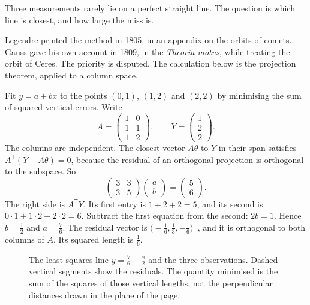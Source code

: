 Three measurements rarely lie on a perfect straight line. The question is which line is closest, and how large the miss is.

Legendre printed the method in 1805, in an appendix on the orbits of comets. Gauss gave his own account in 1809, in the \emph{Theoria motus}, while treating the orbit of Ceres. The priority is disputed. The calculation below is the projection theorem, applied to a column space.

\begin{examplex}
Fit $y=a+bx$ to the points $(0,1)$, $(1,2)$ and $(2,2)$ by minimising the sum of squared vertical errors. Write
\[
A=\begin{pmatrix}1&0\\1&1\\1&2\end{pmatrix},\qquad
Y=\begin{pmatrix}1\\2\\2\end{pmatrix}.
\]
The columns are independent. The closest vector $A\theta$ to $Y$ in their span satisfies $A^{\mathsf T}(Y-A\theta)=0$, because the residual of an orthogonal projection is orthogonal to the subspace. So
\[
\begin{pmatrix}3&3\\3&5\end{pmatrix}\begin{pmatrix}a\\ b\end{pmatrix}=\begin{pmatrix}5\\ 6\end{pmatrix}.
\]
The right side is $A^{\mathsf T}Y$. Its first entry is $1+2+2=5$, and its second is $0\cdot1+1\cdot2+2\cdot2=6$. Subtract the first equation from the second: $2b=1$. Hence $b=\frac12$ and $a=\frac76$. The residual vector is $\bigl(-\frac16,\frac13,-\frac16\bigr)^{\mathsf T}$, and it is orthogonal to both columns of $A$. Its squared length is $\frac16$.
\end{examplex}

\begin{figure}[ht]\centering{}
\caption{The least-squares line $y=\frac76+\frac x2$ and the three observations. Dashed vertical segments show the residuals. The quantity minimised is the sum of the squares of those vertical lengths, not the perpendicular distances drawn in the plane of the page.}\end{figure}

